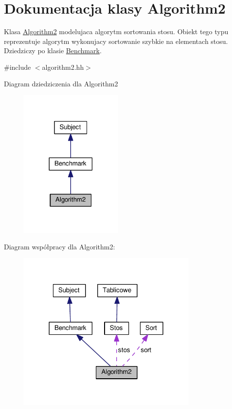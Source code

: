 \hypertarget{class_algorithm2}{\section{Dokumentacja klasy Algorithm2}
\label{class_algorithm2}
}


Klasa \hyperlink{class_algorithm2}{Algorithm2} modelujaca algorytm sortowania stosu. Obiekt tego typu reprezentuje algorytm wykonujacy sortowanie szybkie na elementach stosu. Dziedziczy po klasie \hyperlink{class_benchmark}{Benchmark}.  




{\ttfamily \#include $<$algorithm2.\-hh$>$}



Diagram dziedziczenia dla Algorithm2\nopagebreak
\begin{figure}[H]
\begin{center}
\leavevmode
\includegraphics[width=146pt]{class_algorithm2__inherit__graph}
\end{center}
\end{figure}


Diagram współpracy dla Algorithm2\-:\nopagebreak
\begin{figure}[H]
\begin{center}
\leavevmode
\includegraphics[width=255pt]{class_algorithm2__coll__graph}
\end{center}
\end{figure}
